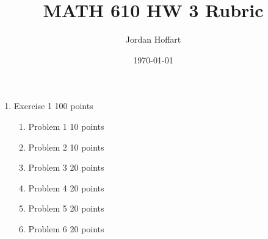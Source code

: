 \documentclass{article}
\title{MATH 610 HW 3 Rubric}
\author{Jordan Hoffart}
\date{\today}
\begin{document}
\maketitle

\begin{enumerate}
  \item Exercise 1 100 points
    \begin{enumerate}
      \item Problem 1 10 points
      \item Problem 2 10 points
      \item Problem 3 20 points
      \item Problem 4 20 points
      \item Problem 5 20 points
      \item Problem 6 20 points
    \end{enumerate}
\end{enumerate}
\end{document}
